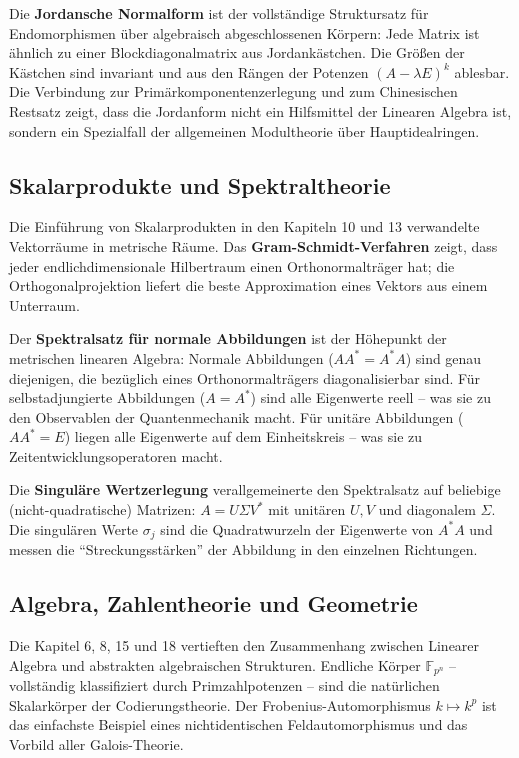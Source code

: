﻿\documentclass[a4paper,12pt]{report}
\theoremstyle{definition}
\begin{document}
Die \textbf{Jordansche Normalform} ist der vollständige
Struktursatz für Endomorphismen über algebraisch abgeschlossenen
Körpern: Jede Matrix ist ähnlich zu einer Blockdiagonalmatrix
aus Jordankästchen. Die Größen der Kästchen sind invariant und
aus den Rängen der Potenzen $(A - \lambda E)^k$ ablesbar.
Die Verbindung zur Primärkomponentenzerlegung und zum Chinesischen
Restsatz zeigt, dass die Jordanform nicht ein Hilfsmittel der
Linearen Algebra ist, sondern ein Spezialfall der
allgemeinen Modultheorie über Hauptidealringen.

\subsection*{Skalarprodukte und Spektraltheorie}

Die Einführung von Skalarprodukten in den Kapiteln 10 und 13
verwandelte Vektorräume in metrische Räume. Das
\textbf{Gram-Schmidt-Verfahren} zeigt, dass jeder
endlichdimensionale Hilbertraum einen Orthonormalträger hat;
die Orthogonalprojektion liefert die beste Approximation
eines Vektors aus einem Unterraum.

Der \textbf{Spektralsatz für normale Abbildungen} ist der
Höhepunkt der metrischen linearen Algebra: Normale Abbildungen
($AA^* = A^*A$) sind genau diejenigen, die bezüglich eines
Orthonormalträgers diagonalisierbar sind. Für selbstadjungierte
Abbildungen ($A = A^*$) sind alle Eigenwerte reell -- was sie
zu den Observablen der Quantenmechanik macht. Für unitäre
Abbildungen ($AA^* = E$) liegen alle Eigenwerte auf dem
Einheitskreis -- was sie zu Zeitentwicklungsoperatoren macht.

Die \textbf{Singuläre Wertzerlegung} verallgemeinerte den
Spektralsatz auf beliebige (nicht-quadratische) Matrizen:
$A = U\Sigma V^*$ mit unitären $U, V$ und diagonalem $\Sigma$.
Die singulären Werte $\sigma_j$ sind die Quadratwurzeln der
Eigenwerte von $A^*A$ und messen die ``Streckungsstärken'' der
Abbildung in den einzelnen Richtungen.

\subsection*{Algebra, Zahlentheorie und Geometrie}

Die Kapitel 6, 8, 15 und 18 vertieften den Zusammenhang zwischen
Linearer Algebra und abstrakten algebraischen Strukturen.
Endliche Körper $\mathbb{F}_{p^n}$ -- vollständig klassifiziert
durch Primzahlpotenzen -- sind die natürlichen Skalarkörper
der Codierungstheorie. Der Frobenius-Automorphismus $k \mapsto k^p$
ist das einfachste Beispiel eines nichtidentischen Feldautomorphismus
und das Vorbild aller Galois-Theorie.
\end{document}
